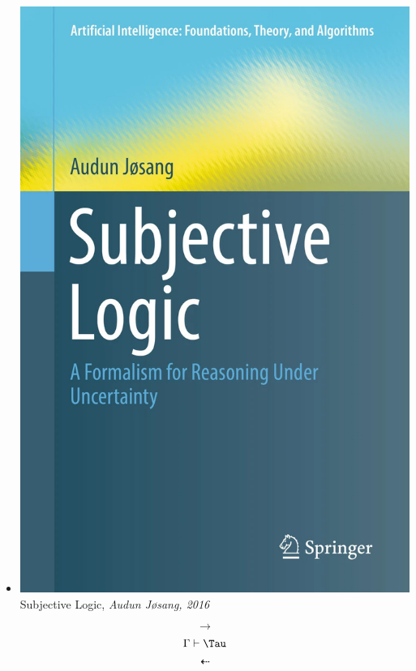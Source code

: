 \documentclass[aspectratio=169]{beamer}
\begin{document}
\begin{frame}
\begin{itemize}
  \item \includegraphics[scale=0.02]{figs/SL.jpg} Subjective Logic, \emph{Audun Jøsang, 2016}\\[1cm]
  \end{itemize}
  $$\rightarrow$$
  $$\Gamma\vdash\Tau$$
  $$\leftdasharrow$$
\end{frame}
\end{document}
